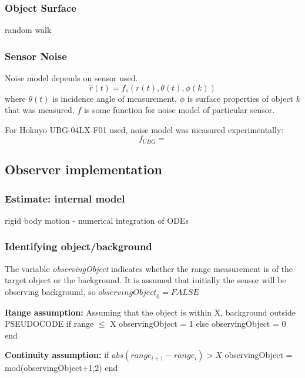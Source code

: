 	\subsubsection{Object Surface}
	random walk
	
	\subsubsection{Sensor Noise}
	Noise model depends on sensor used.
	\begin{equation}
		\hat{r}(t) = f_s(r(t),\theta(t),\phi(k))
	\end{equation}
	where $\theta(t)$ is incidence angle of measurement, $\phi$ is surface properties of object $k$ that was measured, $f$ is some function for noise model of particular sensor.
	
	For Hokuyo UBG-04LX-F01 used, noise model was measured experimentally:
	\begin{equation}
		f_{UBG} = 
	\end{equation}
	
	
\subsection{Observer implementation}
	\subsubsection{Estimate: internal model}
		rigid body motion - numerical integration of ODEs
	
	\subsubsection{Identifying object/background}
		The variable \textit{observingObject} indicates whether the range measurement is of the target object or the background. It is assumed that initially the sensor will be observing background, so $\textit{observingObject}_0 = FALSE$

		\textbf{Range assumption:}
		Assuming that the object is within X, background outside
		PSEUDOCODE
		if range $\leq$ X
			observingObject = 1
		else
			observingObject = 0
		end
		
		\textbf{Continuity assumption:}
		if $abs(range_{i+1}-range_i) > X$
			observingObject = mod(observingObject+1,2)
		end
		
